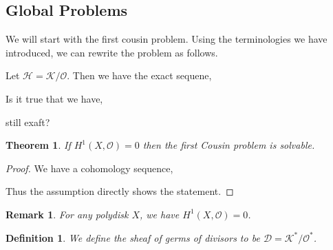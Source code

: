 \documentclass{article}
\newtheorem{theorem}{Theorem} [section]
\newtheorem{definition}{Definition}[section]
\newtheorem{remark}{Remark}[section]
\newcommand{\Ouv}[0]{\mathcal{O}}
\begin{document}
\subsection{Global Problems}

We will start with the first cousin problem. Using the terminologies we have introduced, we can rewrite the problem as follows.
\par Let $\mathcal{H}=\mathcal{K}/\Ouv$. Then we have the exact sequene,
\begin{center}
\end{center}
Is it true that we have,
\begin{center}
\end{center}
still exaft?
\begin{theorem}
  If $H^1(X,\Ouv)=0$ then the first Cousin problem is solvable.
\end{theorem}

\begin{proof}
  We have a cohomology sequence,
  \begin{center}
  \end{center}
  Thus the assumption directly shows the statement.
\end{proof}

\begin{remark}
  For any polydisk $X$, we have $H^1(X,\Ouv)=0$.
\end{remark}

\begin{definition}
  We define the sheaf of germs of divisors to be $\mathcal{D} = \mathcal{K}^*/\Ouv^*$. 
\end{definition}
\end{document}
